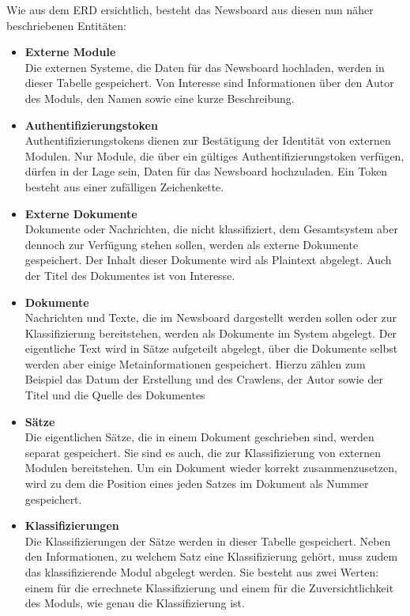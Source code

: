 Wie aus dem ERD ersichtlich, besteht das Newsboard aus diesen nun näher beschriebenen 
Entitäten:
\begin{itemize}
	\item \textbf{Externe Module}\\
	Die externen Systeme, die Daten für das Newsboard hochladen, werden in dieser Tabelle
	gespeichert. Von Interesse sind Informationen über den Autor des Moduls,
	den Namen sowie eine kurze Beschreibung.
	\item \textbf{Authentifizierungstoken}\\
	Authentifizierungstokens dienen zur Bestätigung der Identität von externen Modulen.
	Nur Module, die über ein gültiges Authentifizierungstoken verfügen, dürfen in der Lage
	sein, Daten für das Newsboard hochzuladen. Ein Token besteht aus einer zufälligen
	Zeichenkette.
	\item \textbf{Externe Dokumente}\\
	Dokumente oder Nachrichten, die nicht klassifiziert, dem Gesamtsystem aber dennoch zur
	Verfügung stehen sollen, werden als externe Dokumente gespeichert. Der Inhalt dieser
	Dokumente wird als Plaintext abgelegt. Auch der Titel des Dokumentes ist von Interesse.
	\item \textbf{Dokumente}\\
	Nachrichten und Texte, die im Newsboard dargestellt werden sollen oder zur
	Klassifizierung bereitstehen, werden als Dokumente im System abgelegt. Der eigentliche
	Text wird in Sätze aufgeteilt abgelegt, über die Dokumente selbst werden aber einige
	Metainformationen gespeichert. Hierzu zählen zum Beispiel das Datum der Erstellung und
	des Crawlens, der Autor sowie der Titel und die Quelle des Dokumentes
	\item \textbf{Sätze}\\
	Die eigentlichen Sätze, die in einem Dokument geschrieben sind, werden separat 
	gespeichert. Sie sind es auch, die zur Klassifizierung von externen Modulen 
	bereitstehen. Um ein Dokument wieder korrekt zusammenzusetzen, wird zu dem die 
	Position eines jeden Satzes im Dokument als Nummer gespeichert.
	\item \textbf{Klassifizierungen}\\
	Die Klassifizierungen der Sätze werden in dieser Tabelle gespeichert. Neben den 
	Informationen, zu welchem Satz eine Klassifizierung gehört, muss zudem das 
	klassifizierende Modul abgelegt werden. Sie besteht aus zwei
	Werten: einem für die errechnete Klassifizierung und einem für die Zuversichtlichkeit des Moduls,
	wie genau die Klassifizierung ist. 
\end{itemize}

